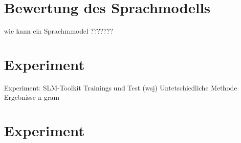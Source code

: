\chapter{Bewertung des Sprachmodells}
\label{chapter:bewertung_sprachmodells}
	
wie kann ein Sprachmmodel ???????

\chapter{Experiment}
\label{chapter:Experiment}

	Experiment:
		SLM-Toolkit
		Trainings und Test (wsj)
		Untetschiedliche Methode
		Ergebnisse
		   n-gram
		   
\chapter{Experiment}
\label{chapter:Experiment}
 